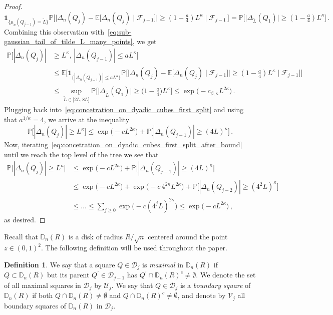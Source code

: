 \documentclass[11pt]{amsart}
\theoremstyle{definition}
\newtheorem{definition}[theorem]{Definition}
\theoremstyle{remark}
\numberwithin{equation}{section}
\newcommand{\bD}{\mathbb D}
\newcommand{\bP}{\mathbb P}
\newcommand{\bE}{\mathbb E}
\begin{document}
\begin{proof}
		\[
		\mathbf{1}_{\{\mu_n(Q_{j-1}) = \widetilde{L}\}} \bP\Big[ \big|\Delta_n(Q_j) - \bE\big[\Delta_n(Q_j)\mid\mathcal{F}_{j-1}\big]\big| \ge (1-\tfrac{a}{4}) L^{\kappa} \mid \mathcal{F}_{j-1}\, \Big] = \bP\Big[\big|\Delta_{\widetilde{L}}(Q_1) \big| \ge (1-\tfrac{a}{4}) L^{\kappa} \Big]\, .
		\]
		Combining this observation with~\eqref{eq:sub-gaussian_tail_of_tilde_L_many_points}, we get
		\begin{align*}
			\bP\big[|\Delta_n(Q_j)| &\ge L^\kappa, \, |\Delta_n(Q_{j-1})| \le aL^\kappa \big] \\ &\le \bE\Big[ \mathbf{1}_{\{|\Delta_n(Q_{j-1})| \le aL^\kappa\}} \bP\Big[ \big|\Delta_n(Q_j)-\bE\big[\Delta_n(Q_j)\mid\mathcal{F}_{j-1}\big]\big| \ge (1-\tfrac{a}{4}) L^{\kappa} \mid \mathcal{F}_{j-1}\Big]\Big] \\ &\le \sup_{\widetilde{L} \in \big[2L,8L\big]} \bP\Big[\big|\Delta_{\widetilde{L}}(Q_1) \big| \ge \big(1-\tfrac{a}{4}\big) L^{\kappa} \Big] \le \exp\Big(-c_{\beta,\kappa} L^{2\kappa}\Big) \, .
		\end{align*}
		Plugging back into~\eqref{eq:concetration_on_dyadic_cubes_first_split} and using that $a^{1/\kappa} = 4$, we arrive at the inequality
		\begin{equation}
			\label{eq:concetration_on_dyadic_cubes_first_split_after_bound}
			\bP\big[|\Delta_n(Q_{j})| \ge L^\kappa\big] \le \exp\Big(-c L^{2\kappa}\Big) + \bP\big[|\Delta_n(Q_{j-1})| \ge (4L)^\kappa\big] \, .
		\end{equation}
		Now, iterating~\eqref{eq:concetration_on_dyadic_cubes_first_split_after_bound} until we reach the top level of the tree we see that
		\begin{align*}
			\bP\big[|\Delta_n(Q_{j})| \ge L^\kappa\big] & \le \exp\Big(-c L^{2\kappa}\Big) + \bP\big[|\Delta_n(Q_{j-1})| \ge (4L)^\kappa\big] \\
			& \le \exp\Big(-c L^{2\kappa}\Big) + \exp\Big(-c\, 4^{2\kappa} L^{2\kappa}\Big) + \bP\big[|\Delta_n(Q_{j-2})| \ge (4^2L)^\kappa\big] \\
			& \le \ldots \le \sum_{j\ge 0} \exp\Big(-c  (4^jL)^{2\kappa}\Big) \le \exp\big(-cL^{2\kappa}\big) \, ,
		\end{align*}
		as desired.
	\end{proof}
	Recall that $\bD_n(R)$ is a disk of radius $R/\sqrt{n}$ centered around the point $z\in(0,1)^2$. The following definition will be used throughout the paper.
	\begin{definition}
		\label{definition:maximal_and_boundary_cubes}
		We say that a square $Q\in \mathcal{D}_j$ is \emph{maximal} in $\bD_n(R)$ if $Q\subset \bD_n(R)$ but its parent $Q^\prime\in \mathcal{D}_{j-1}$ has $Q^\prime\cap \bD_n(R)^c \not=\emptyset$. We denote the set of all maximal squares in $\mathcal{D}_j$ by $\mathcal{U}_j$. We say that $Q\in \mathcal{D}_j$ is a \emph{boundary square} of $\bD_n(R)$ if both $Q\cap \bD_n(R)\not=\emptyset$ and $Q\cap \bD_n(R)^c\not=\emptyset$, and denote by $\mathcal{V}_j$ all boundary squares of $\bD_n(R)$ in $\mathcal{D}_j$.
	\end{definition}
\end{document}
